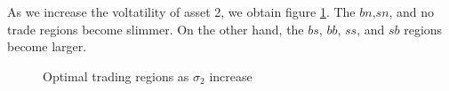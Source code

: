 \documentclass[10pt]{article}
\begin{document}
As we increase the voltatility of asset 2, we obtain figure \ref{ex2_3}. The $bn$,$sn$, and no trade regions become slimmer. On the other hand, the $bs$, $bb$, $ss$, and $sb$ regions become larger.

\begin{figure}[h]
    \centering
    \caption{Optimal trading regions as $\sigma_2$ increase}
    \label{ex2_3}   
\end{figure}

\newpage
\end{document}
